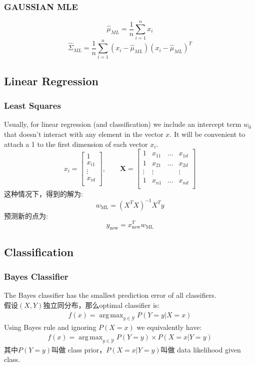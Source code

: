 \documentclass{article} 	%
\DeclareMathOperator*{\argmax}{arg\,max}
\begin{document}
		\subsubsection{GAUSSIAN MLE}
			$$\hat{\mu}_{\scriptscriptstyle ML} = \frac{1}{n}\sum_{i=1}^nx_i$$
			$$\hat{\Sigma}_{\scriptscriptstyle ML} = \frac{1}{n}\sum_{i=1}^n(x_i - \hat{\mu}_{\scriptscriptstyle ML})(x_i - \hat{\mu}_{\scriptscriptstyle ML})^T$$
	
	\subsection{Linear Regression}
		\subsubsection{Least Squares}
			Usually, for linear regression (and classification) we include an intercept term $w_0$ that doesn’t interact with any element in the vector $x$. It will be 
			convenient to attach a 1 to the first dimension of each vector $x_i$.
			\[
			x_i = \left [
				\begin{array}{c}
				1\\
				x_{i1}\\
				\vdots\\
				x_{id}\\
				\end{array}
				\right ]
			, \qquad
			\mathbf{X} = \left [
					    \begin{array}{cccc}
					    1 &x_{11}& \ldots & x_{1d}\\
					    1 &x_{21}& \ldots & x_{2d}\\
					    \vdots &\vdots&  & \vdots\\
					    1 &x_{n1}& \ldots & x_{nd}\\
					    \end{array}
					    \right]
			\]
			这种情况下，得到的解为:
			\[
			w_{\scriptscriptstyle \mathrm{ML}} = (X^TX)^{-1}X^Ty
			\]
			预测新的点为:
			$$y_{\scriptscriptstyle\mathrm{new}} = x_{\scriptscriptstyle\mathrm{new}}^Tw_{\scriptscriptstyle \mathrm{ML}} $$
			
	\subsection{Classification}
		\subsubsection{Bayes Classifier}
			The Bayes classifier has the smallest prediction error of all classifiers.\\
			假设$(X,Y)$独立同分布，那么optimal classifier is:
			\begin{eqnarray}
			f(x) = \argmax_{y\in \mathcal{Y}} P(Y=y|X=x)
			\end{eqnarray}
 			Using Bayes rule and ignoring $P(X = x)$ we equivalently have: 
			\begin{eqnarray}
			f(x) = \argmax_{y\in \mathcal{Y}} P(Y=y)\times P(X=x|Y=y)
			\end{eqnarray}
			其中$P(Y=y)$叫做 class prior，$P(X=x|Y=y)$叫做 data likelihood given class.
		
	
	
			
		
	
\end{document}
